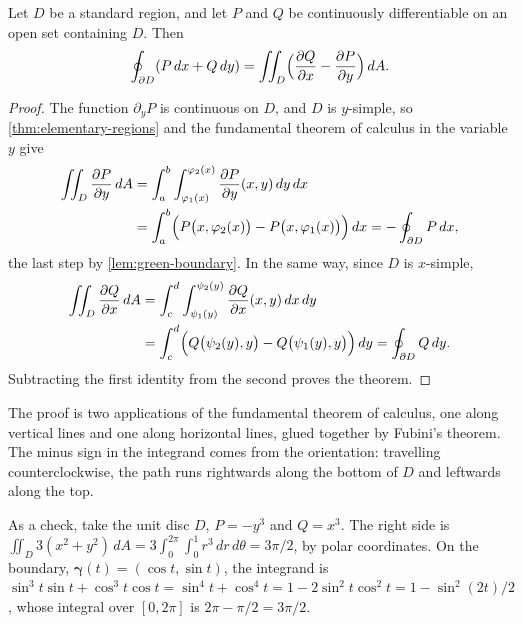 \begin{theorem}
\label{thm:green-standard}
Let $D$ be a standard region, and let $P$ and $Q$ be continuously differentiable on an open set containing $D$. Then
\[
\oint_{\partial D}(P\,dx+Q\,dy)=\iint_D\Bigl(\frac{\partial Q}{\partial x}-\frac{\partial P}{\partial y}\Bigr)\,dA .
\]
\end{theorem}

\begin{proof}
The function $\partial_yP$ is continuous on $D$, and $D$ is $y$-simple, so \cref{thm:elementary-regions} and the fundamental theorem of calculus in the variable $y$ give
\[
\begin{aligned}
\iint_D\frac{\partial P}{\partial y}\,dA&=\int_a^b\int_{\varphi_1(x)}^{\varphi_2(x)}\frac{\partial P}{\partial y}(x,y)\,dy\,dx\\
&=\int_a^b\Bigl(P\bigl(x,\varphi_2(x)\bigr)-P\bigl(x,\varphi_1(x)\bigr)\Bigr)\,dx=-\oint_{\partial D}P\,dx ,
\end{aligned}
\]
the last step by \cref{lem:green-boundary}. In the same way, since $D$ is $x$-simple,
\[
\begin{aligned}
\iint_D\frac{\partial Q}{\partial x}\,dA&=\int_c^d\int_{\psi_1(y)}^{\psi_2(y)}\frac{\partial Q}{\partial x}(x,y)\,dx\,dy\\
&=\int_c^d\Bigl(Q\bigl(\psi_2(y),y\bigr)-Q\bigl(\psi_1(y),y\bigr)\Bigr)\,dy=\oint_{\partial D}Q\,dy .
\end{aligned}
\]
Subtracting the first identity from the second proves the theorem.
\end{proof}

The proof is two applications of the fundamental theorem of calculus, one along vertical lines and one along horizontal lines, glued together by Fubini's theorem. The minus sign in the integrand comes from the orientation: travelling counterclockwise, the path runs rightwards along the bottom of $D$ and leftwards along the top.

As a check, take the unit disc $D$, $P=-y^3$ and $Q=x^3$. The right side is $\iint_D3(x^2+y^2)\,dA=3\int_0^{2\pi}\int_0^1r^3\,dr\,d\theta=3\pi/2$, by polar coordinates. On the boundary, $\boldsymbol\gamma(t)=(\cos t,\sin t)$, the integrand is $\sin^3t\sin t+\cos^3t\cos t=\sin^4t+\cos^4t=1-2\sin^2t\cos^2t=1-\sin^2(2t)/2$, whose integral over $[0,2\pi]$ is $2\pi-\pi/2=3\pi/2$.

